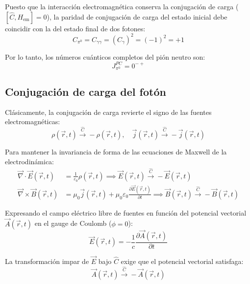 Puesto que la interacción electromagnética conserva la conjugación de carga ($[\hat{C}, H_{\text{em}}] = 0$), la paridad de conjugación de carga del estado inicial debe coincidir con la del estado final de dos fotones:
\begin{equation}
    C_{\pi^0} = C_{\gamma\gamma} = (C_\gamma)^2 = (-1)^2 = +1
\end{equation}

Por lo tanto, los números cuánticos completos del pión neutro son:
\begin{equation}
    J_{\pi^0}^{PC} = 0^{-+}
\end{equation}

\subsection{Conjugación de carga del fotón}

Clásicamente, la conjugación de carga revierte el signo de las fuentes electromagnéticas:
\begin{equation}
    \rho(\vec{r},t) \xrightarrow{\hat{C}} -\rho(\vec{r},t), \quad \vec{j}(\vec{r},t) \xrightarrow{\hat{C}} -\vec{j}(\vec{r},t)
\end{equation}

Para mantener la invariancia de forma de las ecuaciones de Maxwell de la electrodinámica:
\begin{align}
    \vec{\nabla} \cdot \vec{E}(\vec{r},t) &= \frac{1}{\varepsilon_0} \rho(\vec{r},t) \implies \vec{E}(\vec{r},t) \xrightarrow{\hat{C}} -\vec{E}(\vec{r},t) \\
    \vec{\nabla} \times \vec{B}(\vec{r},t) &= \mu_0 \vec{j}(\vec{r},t) + \mu_0 \varepsilon_0 \frac{\partial \vec{E}(\vec{r},t)}{\partial t} \implies \vec{B}(\vec{r},t) \xrightarrow{\hat{C}} -\vec{B}(\vec{r},t)
\end{align}

Expresando el campo eléctrico libre de fuentes en función del potencial vectorial $\vec{A}(\vec{r},t)$ en el gauge de Coulomb ($\phi = 0$):
\begin{equation}
    \vec{E}(\vec{r},t) = -\frac{1}{c} \frac{\partial \vec{A}(\vec{r},t)}{\partial t}
\end{equation}

La transformación impar de $\vec{E}$ bajo $\hat{C}$ exige que el potencial vectorial satisfaga:
\begin{equation}
    \vec{A}(\vec{r},t) \xrightarrow{\hat{C}} -\vec{A}(\vec{r},t)
\end{equation}

